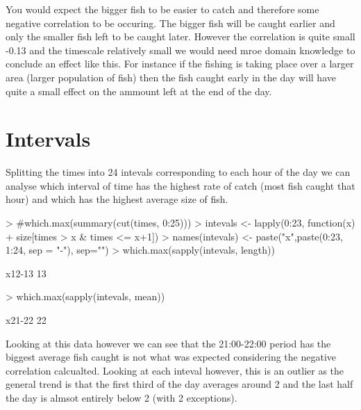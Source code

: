 \documentclass{article}
\begin{document}
You would expect the bigger fish to be easier to catch and therefore some negative correlation to be occuring. The bigger fish will be caught earlier and only the smaller fish left to be caught later. However the correlation is quite small -0.13 and the timescale relatively small we would need mroe domain knowledge to conclude an effect like this. For instance if the fishing is taking place over a larger area (larger population of fish) then the fish caught early in the day will have quite a small effect on the ammount left at the end of the day. 
\section{Intervals}
Splitting the times into 24 intevals corresponding to each hour of the day we can analyse which interval of time has the highest rate of catch (most fish caught that hour) and which has the highest average size of fish. 
\begin{Schunk}
\begin{Sinput}
> #which.max(summary(cut(times, 0:25)))
> intevals <- lapply(0:23, function(x)
+   size[times > x & times <= x+1])
> names(intevals) <- paste("x",paste(0:23, 1:24, sep = "-"), sep="")
> which.max(sapply(intevals, length))
\end{Sinput}
\begin{Soutput}
x12-13 
    13 
\end{Soutput}
\begin{Sinput}
> which.max(sapply(intevals, mean))
\end{Sinput}
\begin{Soutput}
x21-22 
    22 
\end{Soutput}
\end{Schunk}
Looking at this data however we can see that the 21:00-22:00 period has the biggest average fish caught is not what was expected considering the negative correlation calcualted. Looking at each inteval however, this is an outlier as the general trend is that the first third of the day averages around 2 and the last half the day is almsot entirely below 2 (with 2 exceptions). 
\end{document}
